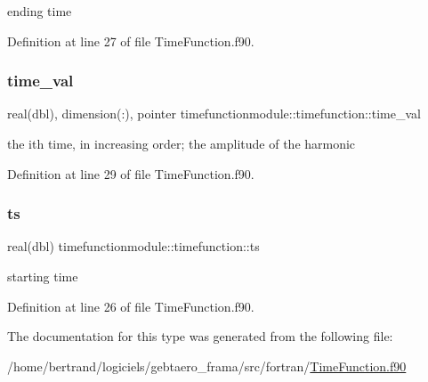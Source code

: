 ending time 



Definition at line 27 of file Time\+Function.\+f90.

\mbox{\label{structtimefunctionmodule_1_1timefunction_abad80cdb684de5f31a51015b9d88751f}} 
\subsubsection{\texorpdfstring{time\+\_\+val}{time\_val}}
{\footnotesize\ttfamily real(dbl), dimension(\+:), pointer timefunctionmodule\+::timefunction\+::time\+\_\+val\hspace{0.3cm}{\ttfamily [private]}}



the ith time, in increasing order; the amplitude of the harmonic 



Definition at line 29 of file Time\+Function.\+f90.

\mbox{\label{structtimefunctionmodule_1_1timefunction_a62e761e489833d17dcd1dbcac5c1dfd6}} 
\subsubsection{\texorpdfstring{ts}{ts}}
{\footnotesize\ttfamily real(dbl) timefunctionmodule\+::timefunction\+::ts\hspace{0.3cm}{\ttfamily [private]}}



starting time 



Definition at line 26 of file Time\+Function.\+f90.



The documentation for this type was generated from the following file\+:\begin{DoxyCompactItemize}
\item 
/home/bertrand/logiciels/gebtaero\+\_\+frama/src/fortran/\hyperlink{_time_function_8f90}{Time\+Function.\+f90}\end{DoxyCompactItemize}
